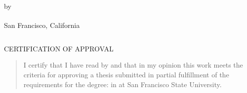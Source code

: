 \documentclass[12pt,oneside]{sfsuthesis}
\theoremstyle{plain} %
\theoremstyle{definition}  %
\theoremstyle{remark}  %
\begin{document}
\thispagestyle{empty}

\[ \]
\vspace{-1.9in}

\begin{center}
{\mytitle}

\vspace{1.4in}


\vspace{.5in}


\vspace{3.1in}

{by \\[12pt] 
\myname \\[12pt]
San Francisco, California\\[12pt]
\thismonth
\thisyear}
\end{center}



\newpage
\thispagestyle{empty}
\[ \]
\vspace{-1.8in}
\begin{center}
{CERTIFICATION OF APPROVAL}
\end{center}
\vspace{.6in}
\begin{quote}
I certify that I have read {\it \mytitle} by \myname and that in my opinion this work meets the criteria for approving a thesis submitted in partial fulfillment of the requirements
for the degree: \mydegree in \myfield at San Francisco State University.
\end{quote}
\end{document}
